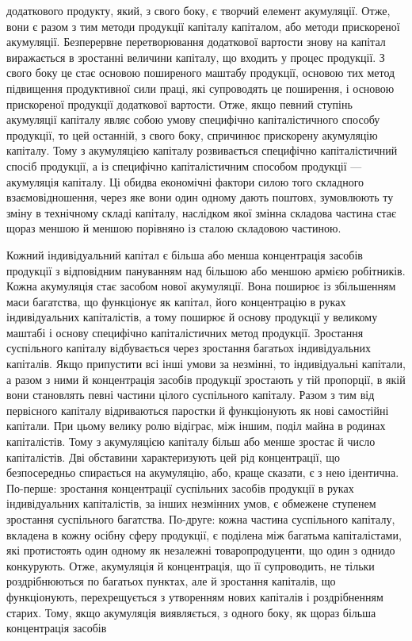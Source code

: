додаткового продукту, який, з свого боку, є творчий елемент
акумуляції. Отже, вони є разом з тим методи продукції капіталу
капіталом, або методи прискореної акумуляції. Безперервне
перетворювання додаткової вартости знову на капітал виражається
в зростанні величини капіталу, що входить у процес продукції.
З свого боку це стає основою поширеного маштабу продукції,
основою тих метод підвищення продуктивної сили праці,
які супроводять це поширення, і основою прискореної продукції
додаткової вартости. Отже, якщо певний ступінь акумуляції
капіталу являє собою умову специфічно капіталістичного способу
продукції, то цей останній, з свого боку, спричинює прискорену
акумуляцію капіталу. Тому з акумуляцією капіталу розвивається
специфічно капіталістичний спосіб продукції, а із специфічно
капіталістичним способом продукції — акумуляція капіталу.
Ці обидва економічні фактори силою того складного взаємовідношення,
через яке вони один одному дають поштовх,
зумовлюють ту зміну в технічному складі капіталу, наслідком
якої змінна складова частина стає щораз меншою й меншою порівняно
із сталою складовою частиною.

Кожний індивідуальний капітал є більша або менша концентрація
засобів продукції з відповідним пануванням над більшою
або меншою армією робітників. Кожна акумуляція стає засобом
нової акумуляції. Вона поширює із збільшенням маси багатства,
що функціонує як капітал, його концентрацію в руках індивідуальних
капіталістів, а тому поширює й основу продукції
у великому маштабі і основу специфічно капіталістичних метод
продукції. Зростання суспільного капіталу відбувається через
зростання багатьох індивідуальних капіталів. Якщо припустити
всі інші умови за незмінні, то індивідуальні капітали, а разом
з ними й концентрація засобів продукції зростають у тій пропорції,
в якій вони становлять певні частини цілого суспільного
капіталу. Разом з тим від первісного капіталу відриваються
паростки й функціонують як нові самостійні капітали. При цьому
велику ролю відіграє, між іншим, поділ майна в родинах капіталістів.
Тому з акумуляцією капіталу більш або менше зростає
й число капіталістів. Дві обставини характеризують цей рід
концентрації, що безпосередньо спирається на акумуляцію,
або, краще сказати, є з нею ідентична. По-перше: зростання концентрації
суспільних засобів продукції в руках індивідуальних
капіталістів, за інших незмінних умов, є обмежене ступенем
зростання суспільного багатства. По-друге: кожна частина суспільного
капіталу, вкладена в кожну осібну сферу продукції,
є поділена між багатьма капіталістами, які протистоять один
одному як незалежні товаропродуценти, що один з однидо конкурують.
Отже, акумуляція й концентрація, що її супроводить,
не тільки роздрібнюються по багатьох пунктах, але й зростання
капіталів, що функціонують, перехрещується з утворенням нових
капіталів і роздрібненням старих. Тому, якщо акумуляція виявляється,
з одного боку, як щораз більша концентрація засобів
